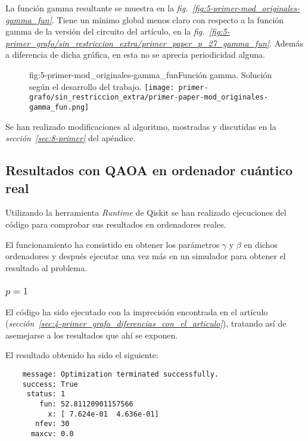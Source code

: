 La función gamma resultante se muestra en la \textit{fig.~\ref{fig:5-primer-mod_originales-gamma_fun}}.
Tiene un mínimo global menos claro con respecto a la función gamma de la versión del circuito del artículo, en la \textit{fig.~\ref{fig:5-primer_grafo/sin_restriccion_extra/primer_paper_p_27_gamma_fun}}.
Además a diferencia de dicha gráfica, en esta no se aprecia periodicidad alguna.

\begin{figure}[Resultados QAOA {--} artículo de Urgelles et al. (2022) {--} función gamma de la implementación de QAOA]{fig:5-primer-mod_originales-gamma_fun}{Función gamma. Solución según el desarrollo del trabajo.}
  \centering
  \texttt{[image: primer-grafo/sin\_restriccion\_extra/primer-paper-mod\_originales-gamma\_fun.png]}
\end{figure}

Se han realizado modificaciones al algoritmo, mostradas y discutidas en la \textit{sección~\ref{sec:8-primer}} del apéndice.

\subsection{Resultados con QAOA en ordenador cuántico real}
Utilizando la herramienta \textit{Runtime} de Qiskit se han realizado ejecuciones del código para comprobar sus resultados en ordenadores reales.

El funcionamiento ha consistido en obtener los parámetros $\gamma$ y $\beta$ en dichos ordenadores y después ejecutar una vez más en un simulador para obtener el resultado al problema.

\subsubsection{\(p = 1\)}
El código ha sido ejecutado con la imprecisión encontrada en el artículo\cite{multi-objective_routing_optimization} (\textit{sección~\ref{sec:4-primer_grafo_diferencias_con_el_articulo}}), tratando así de asemejarse a los resultados que ahí se exponen.

El resultado obtenido ha sido el siguiente:

\begin{verbatim}
    message: Optimization terminated successfully.
    success: True
     status: 1
        fun: 52.81120901157566
          x: [ 7.624e-01  4.636e-01]
       nfev: 30
      maxcv: 0.0
\end{verbatim}

